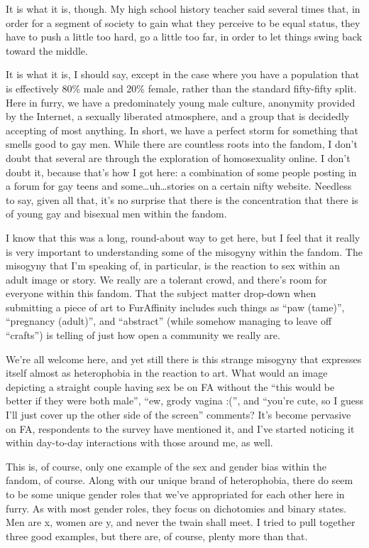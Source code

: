 It is what it is, though.  My high school history teacher said several times that, in order for a segment of society to gain what they perceive to be equal status, they have to push a little too hard, go a little too far, in order to let things swing back toward the middle.

It is what it is, I should say, except in the case where you have a population that is effectively 80\% male and 20\% female, rather than the standard fifty-fifty split. Here in furry, we have a predominately young male culture, anonymity provided by the Internet, a sexually liberated atmosphere, and a group that is decidedly accepting of most anything.  In short, we have a perfect storm for something that smells good to gay men.  While there are countless roots into the fandom, I don’t doubt that several are through the exploration of homosexuality online.  I don’t doubt it, because that’s how I got here: a combination of some people posting in a forum for gay teens and some…uh…stories on a certain nifty website.  Needless to say, given all that, it’s no surprise that there is the concentration that there is of young gay and bisexual men within the fandom.

I know that this was a long, round-about way to get here, but I feel that it really is very important to understanding some of the misogyny within the fandom.  The misogyny that I’m speaking of, in particular, is the reaction to sex within an adult image or story.  We really are a tolerant crowd, and there’s room for everyone within this fandom.  That the subject matter drop-down when submitting a piece of art to FurAffinity includes such things as ``paw (tame)'', ``pregnancy (adult)'', and ``abstract'' (while somehow managing to leave off ``crafts'') is telling of just how open a community we really are.

We’re all welcome here, and yet still there is this strange misogyny that expresses itself almost as heterophobia in the reaction to art.  What would an image depicting a straight couple having sex be on FA without the ``this would be better if they were both male'', ``ew, grody vagina :('', and ``you’re cute, so I guess I’ll just cover up the other side of the screen'' comments?  It’s become pervasive on FA, respondents to the survey have mentioned it, and I’ve started noticing it within day-to-day interactions with those around me, as well.

This is, of course, only one example of the sex and gender bias within the fandom, of course.  Along with our unique brand of heterophobia, there do seem to be some unique gender roles that we’ve appropriated for each other here in furry. As with most gender roles, they focus on dichotomies and binary states. Men are x, women are y, and never the twain shall meet. I tried to pull together three good examples, but there are, of course, plenty more than that.


